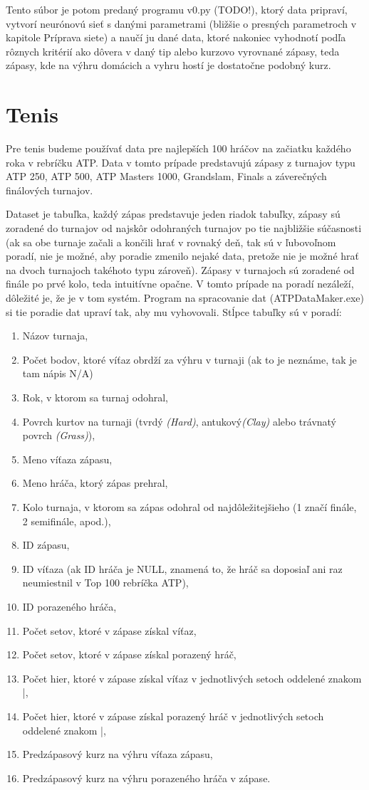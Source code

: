 Tento súbor je potom predaný programu v0.py (TODO!), ktorý data pripraví, vytvorí neurónovú sieť s danými parametrami (bližšie o presných parametroch v kapitole Príprava siete) a naučí ju dané data, ktoré nakoniec vyhodnotí podľa rôznych kritérií ako dôvera v daný tip alebo kurzovo vyrovnané zápasy, teda zápasy, kde na výhru domácich a vyhru hostí je dostatočne podobný kurz.

\section{Tenis}
Pre tenis budeme používať data pre najlepších 100 hráčov na začiatku každého roka v rebríčku ATP. Data v tomto prípade predstavujú zápasy z turnajov typu ATP 250, ATP 500, ATP Masters 1000, Grandslam, Finals a záverečných finálových turnajov.

Dataset je tabuľka, každý zápas predstavuje jeden riadok tabuľky, zápasy sú zoradené do turnajov od najskôr odohraných turnajov po tie najbližšie súčasnosti (ak sa obe turnaje začali a končili hrať v rovnaký deň, tak sú v ľubovoľnom poradí, nie je možné, aby poradie zmenilo nejaké data, pretože nie je možné hrať na dvoch turnajoch takéhoto typu zároveň). 
Zápasy v turnajoch sú zoradené od finále po prvé kolo, teda intuitívne opačne. 
V tomto prípade na poradí nezáleží, dôležité je, že je v tom systém. Program na spracovanie dat (ATPDataMaker.exe) si tie poradie dat upraví tak, aby mu vyhovovali. 
Stĺpce tabuľky sú v poradí:
\begin{enumerate}
  \item Názov turnaja,
  \item Počet bodov, ktoré víťaz obrdží za výhru v turnaji (ak to je neznáme, tak je tam nápis N/A)
  \item Rok, v ktorom sa turnaj odohral,
  \item Povrch kurtov na turnaji (tvrdý \textit{(Hard)}, antukový\textit{(Clay)} alebo trávnatý povrch \textit{(Grass)}),
  \item Meno víťaza zápasu,
  \item Meno hráča, ktorý zápas prehral,
  \item Kolo turnaja, v ktorom sa zápas odohral od najdôležitejšieho (1 značí finále, 2 semifinále, apod.),
  \item ID zápasu,
  \item ID víťaza (ak ID hráča je NULL, znamená to, že hráč sa doposiaľ ani raz neumiestnil v Top 100 rebríčka ATP),
  \item ID porazeného hráča,
  \item Počet setov, ktoré v zápase získal víťaz,
  \item Počet setov, ktoré v zápase získal porazený hráč,
  \item Počet hier, ktoré v zápase získal víťaz v jednotlivých setoch oddelené znakom |,
  \item Počet hier, ktoré v zápase získal porazený hráč v jednotlivých setoch oddelené znakom |,
  \item Predzápasový kurz na výhru víťaza zápasu,
  \item Predzápasový kurz na výhru porazeného hráča v zápase.
\end{enumerate}


